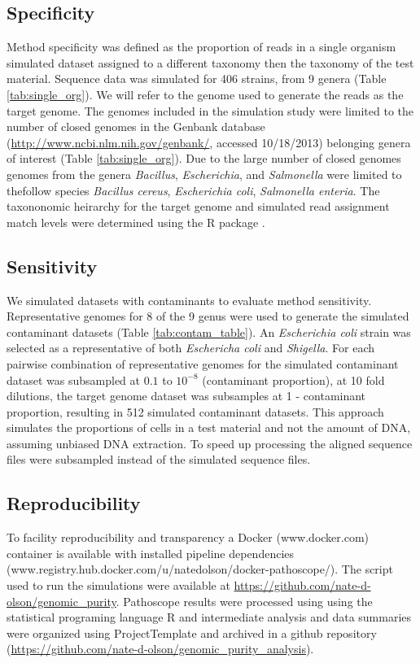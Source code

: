 \documentclass[fleqn,10pt,lineno]{wlpeerj}\usepackage[]{graphicx}\usepackage[]{color}
\begin{document}
\subsection*{Specificity} 
Method specificity was defined as the proportion of reads in a single organism simulated dataset assigned to a different taxonomy then the taxonomy of the test material. 
Sequence data was simulated for 406 strains, from 9 genera (Table \ref{tab:single_org}). 
We will refer to the genome used to generate the reads as the target genome. 
The genomes included in the simulation study were limited to the number of closed genomes in the Genbank database (\url{http://www.ncbi.nlm.nih.gov/genbank/}, accessed 10/18/2013) belonging genera of interest (Table \ref{tab:single_org}). 
Due to the large number of closed genomes genomes from the genera \textit{Bacillus}, \textit{Escherichia}, and \textit{Salmonella} were limited to thefollow species \textit{Bacillus cereus}, \textit{Escherichia coli}, \textit{Salmonella enteria}. 
The taxononomic heirarchy for the target genome and simulated read assignment match levels were determined using the R package \citep{TaxizeArticle,TaxizeManual}. 

\subsection*{Sensitivity}
We simulated datasets with contaminants to evaluate method sensitivity. 
Representative genomes for 8 of the 9 genus were used to generate the simulated contaminant datasets (Table \ref{tab:contam_table}). 
An \textit{Escherichia coli} strain was selected as a representative of both \textit{Eschericha coli} and \textit{Shigella}. 
For each pairwise combination of representative genomes for the simulated contaminant dataset was subsampled at $0.1$ to $10^{-8}$ (contaminant proportion), at 10 fold dilutions, the target genome dataset was subsamples at 1 - contaminant proportion, resulting in 512 simulated contaminant datasets. 
This approach simulates the proportions of cells in a test material and not the amount of DNA, assuming unbiased DNA extraction. 
To speed up processing the aligned sequence files were subsampled instead of the simulated sequence files. 

\subsection*{Reproducibility}
To facility reproducibility and transparency a Docker (www.docker.com) container is available with installed pipeline dependencies (www.registry.hub.docker.com/u/natedolson/docker-pathoscope/). 
The script used to run the simulations were available at \url{https://github.com/nate-d-olson/genomic_purity}. 
Pathoscope results were processed using using the statistical programing language R \citep{R} and intermediate analysis and data summaries were organized using ProjectTemplate \citep{ProjectTemplate} and archived in a github repository (\url{https://github.com/nate-d-olson/genomic_purity_analysis}).
\end{document}
